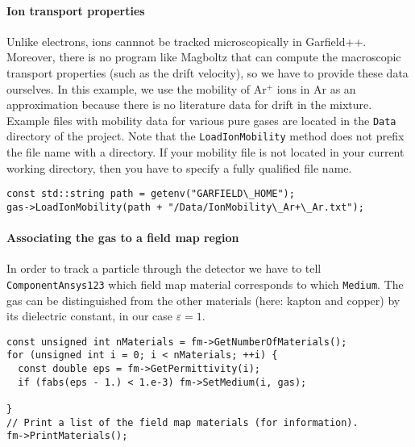 \paragraph{Ion transport properties}
Unlike electrons, ions cannnot be tracked microscopically in Garfield++.
Moreover, there is no program like Magboltz that can compute  
the macroscopic transport properties (such as the drift velocity),
so we have to provide these data ourselves.
In this example, we use the mobility of Ar$^{+}$ ions in Ar
as an approximation because there is no literature data for drift in the
mixture.
Example files with mobility data for various pure gases are located
in the \texttt{Data} directory of the project.
Note that the \texttt{LoadIonMobility} method does not prefix
the file name with a directory.
If your mobility file is not located in your current working directory,
then you have to specify a fully qualified file name.
\begin{lstlisting}
const std::string path = getenv("GARFIELD\_HOME");
gas->LoadIonMobility(path + "/Data/IonMobility\_Ar+\_Ar.txt");
\end{lstlisting}
\paragraph{Associating the gas to a field map region}
In order to track a particle through the detector we have to 
tell \texttt{ComponentAnsys123} which field map material corresponds 
to which \texttt{Medium}.
The gas can be distinguished from the other materials
(here: kapton and copper) by its dielectric constant, in our case
$\varepsilon = 1$.
\begin{lstlisting}
const unsigned int nMaterials = fm->GetNumberOfMaterials();
for (unsigned int i = 0; i < nMaterials; ++i) {
  const double eps = fm->GetPermittivity(i);
  if (fabs(eps - 1.) < 1.e-3) fm->SetMedium(i, gas);

}
// Print a list of the field map materials (for information).
fm->PrintMaterials();
\end{lstlisting}

